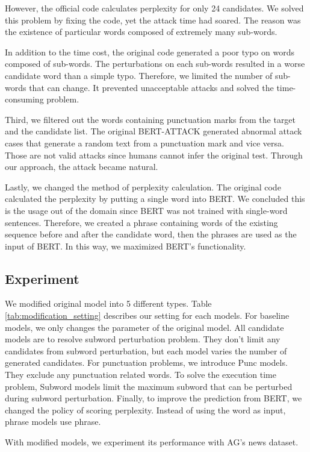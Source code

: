 \documentclass[11pt,a4paper]{article}
\begin{document}
\noindent However, the official code calculates perplexity for only 24 candidates. We solved this problem by fixing the code, yet the attack time had soared. The reason was the existence of particular words composed of extremely many sub-words.

In addition to the time cost, the original code generated a poor typo on words composed of sub-words. The perturbations on each sub-words resulted in a worse candidate word than a simple typo. Therefore, we limited the number of sub-words that can change. It prevented unacceptable attacks and solved the time-consuming problem.

Third, we filtered out the words containing punctuation marks from the target and the candidate list. The original BERT-ATTACK generated abnormal attack cases that generate a random text from a punctuation mark and vice versa. Those are not valid attacks since humans cannot infer the original test. Through our approach, the attack became natural. 

Lastly, we changed the method of perplexity calculation. The original code calculated the perplexity by putting a single word into BERT. We concluded this is the usage out of the domain since BERT was not trained with single-word sentences. Therefore, we created a phrase containing words of the existing sequence before and after the candidate word, then the phrases are used as the input of BERT. In this way, we maximized BERT’s functionality.

\subsection{Experiment}

We modified original model into 5 different types.
Table \ref{tab:modification_setting} describes our setting for each models.
For baseline models, we only changes the parameter of the original model.
All candidate models are to resolve subword perturbation problem. They don't limit any candidates from subword perturbation, but each model varies the number of generated candidates.
For punctuation problems, we introduce Punc models. They exclude any punctuation related words.
To solve the execution time problem, Subword models limit the maximum subword that can be perturbed during subword perturbation.
Finally, to improve the prediction from BERT, we changed the policy of scoring perplexity. Instead of using the word as input, phrase models use phrase.


With modified models, we experiment its performance with AG's news dataset. 
\end{document}
